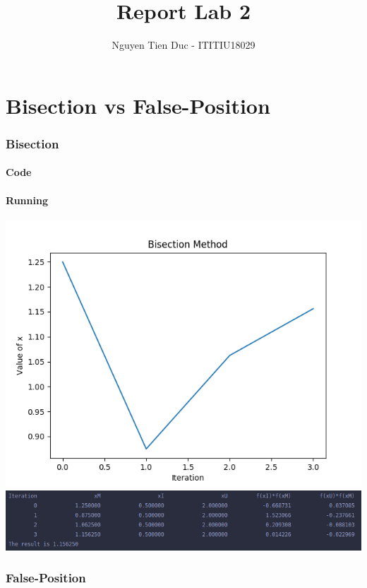 \documentclass[12pt]{article}
\begin{document}
  \title{Report Lab 2}
  \author{Nguyen Tien Duc - ITITIU18029}
  \maketitle
  \part{Bisection vs False-Position}
    \section*{Bisection}
      \subsection*{Code}
      \subsection*{Running}
        \begin{center}
            \includegraphics{BisectionGraph.png}
            \includegraphics{BisectionResult.png}
        \end{center}
    \section*{False-Position}
\end{document}
